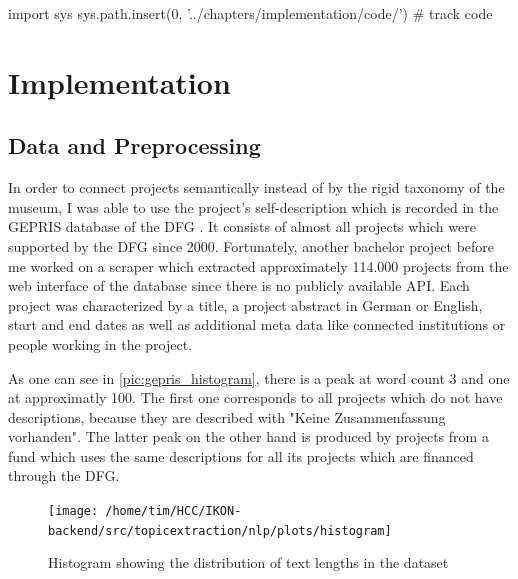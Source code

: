 % 
\begin{pycode}
import sys
sys.path.insert(0, '../chapters/implementation/code/')
# track code

\end{pycode}

\chapter{Implementation}
\label{chap:implementation}

\section{Data and Preprocessing}
In order to connect projects semantically instead of by the rigid taxonomy of the museum, I was able to use the project's self-description which is recorded in the GEPRIS database of the DFG \cite{DFGGEPRIS}. It consists of almost all projects which were supported by the DFG since 2000. Fortunately, another bachelor project before me worked on a scraper which extracted approximately 114.000 projects from the web interface of the database since there is no publicly available API. Each project was characterized by a title, a project abstract in German or English, start and end dates as well as additional meta data like connected institutions or people working in the project.

As one can see in \autoref{pic:gepris_histogram}, there is a peak at word count 3 and one at approximatly 100. The first one corresponds to all projects which do not have descriptions, because they are described with "Keine Zusammenfassung vorhanden". The latter peak on the other hand is produced by projects from a fund which uses the same descriptions for all its projects which are financed through the DFG.

\begin{figure}[t]
	\centering
	\texttt{[image: /home/tim/HCC/IKON-backend/src/topicextraction/nlp/plots/histogram]}
	\caption{\label{pic:gepris_histogram} Histogram showing the distribution of text lengths in the dataset}
\end{figure}

